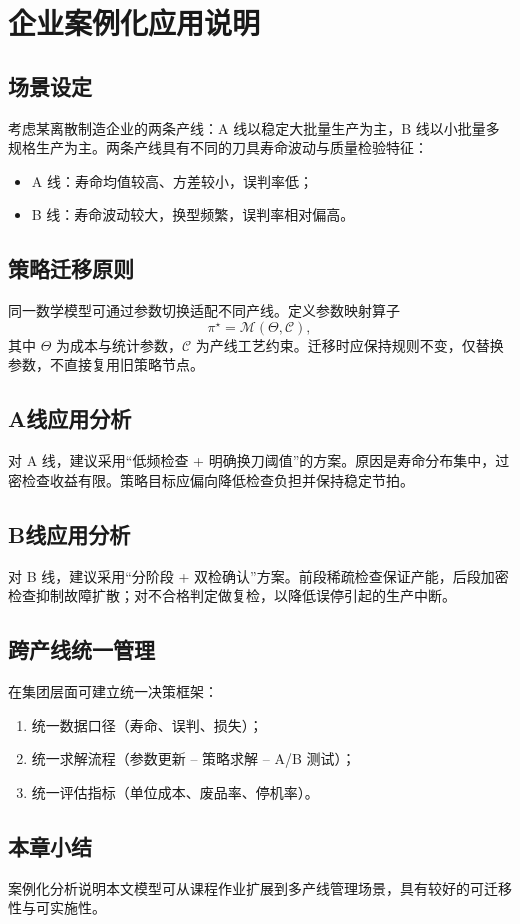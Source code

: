 \chapter{企业案例化应用说明}

\section{场景设定}
考虑某离散制造企业的两条产线：A 线以稳定大批量生产为主，B 线以小批量多规格生产为主。两条产线具有不同的刀具寿命波动与质量检验特征：
\begin{itemize}
  \item A 线：寿命均值较高、方差较小，误判率低；
  \item B 线：寿命波动较大，换型频繁，误判率相对偏高。
\end{itemize}

\section{策略迁移原则}
同一数学模型可通过参数切换适配不同产线。定义参数映射算子
\[
\pi^\star=\mathcal M(\Theta,\mathcal C),
\]
其中 $\Theta$ 为成本与统计参数，$\mathcal C$ 为产线工艺约束。迁移时应保持规则不变，仅替换参数，不直接复用旧策略节点。

\section{A线应用分析}
对 A 线，建议采用“低频检查 + 明确换刀阈值”的方案。原因是寿命分布集中，过密检查收益有限。策略目标应偏向降低检查负担并保持稳定节拍。

\section{B线应用分析}
对 B 线，建议采用“分阶段 + 双检确认”方案。前段稀疏检查保证产能，后段加密检查抑制故障扩散；对不合格判定做复检，以降低误停引起的生产中断。

\section{跨产线统一管理}
在集团层面可建立统一决策框架：
\begin{enumerate}
  \item 统一数据口径（寿命、误判、损失）；
  \item 统一求解流程（参数更新 -- 策略求解 -- A/B 测试）；
  \item 统一评估指标（单位成本、废品率、停机率）。
\end{enumerate}

\section{本章小结}
案例化分析说明本文模型可从课程作业扩展到多产线管理场景，具有较好的可迁移性与可实施性。
